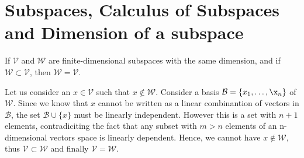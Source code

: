 \section{Subspaces, Calculus of Subspaces and Dimension of a subspace}

\begin{problem}
  If $\mathcal{V}$ and $\mathcal{W}$ are finite-dimensional subspaces with the same dimension, and if $\mathcal{W} \subset \mathcal{V}$, then $\mathcal{W} = \mathcal{V}$.
\end{problem}

\begin{solution}
  Let us consider an $x \in \mathcal{V}$ such that $x \notin \mathcal{W}$.
  Consider a basis $\mathcal{B} = \{x_1, \ldots, \x_n\}$ of $\mathcal{W}$.
  Since we know that $x$ cannot be written as a linear combinantion of vectors in $\mathcal{B}$, the set $\mathcal{B} \cup \{x\}$ must be linearly independent.
  However this is a set with $n + 1$ elements, contradiciting the fact that any subset with $m > n$ elements of an n-dimensional vectors space is linearly dependent.
  Hence, we cannot have $x \notin \mathcal{W}$, thus $\mathcal{V} \subset \mathcal{W}$ and finally $\mathcal{V} = \mathcal{W}$.
\end{solution}


